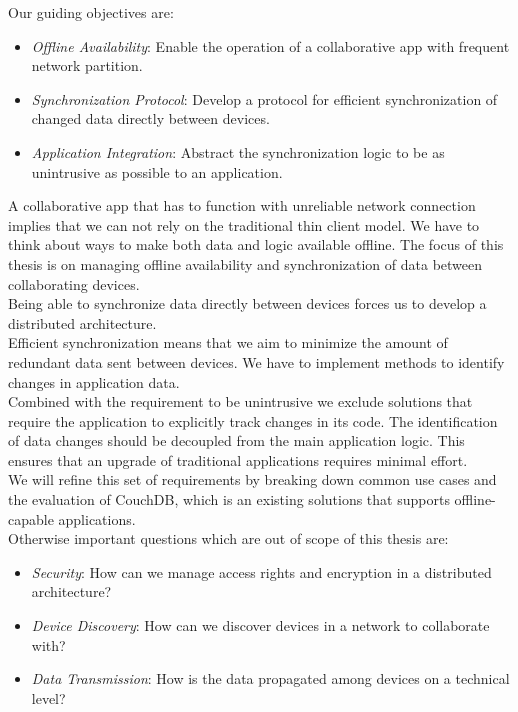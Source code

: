 Our guiding objectives are:

\begin{itemize}
\item \emph{Offline Availability}: Enable the operation of a collaborative app with frequent network partition.
\item \emph{Synchronization Protocol}: Develop a protocol for efficient synchronization of changed data directly between devices.
\item \emph{Application Integration}: Abstract the synchronization logic to be as unintrusive as possible to an application.
\end{itemize}

A collaborative app that has to function with unreliable network connection implies that we can not rely on the traditional thin client model.
We have to think about ways to make both data and logic available offline.
The focus of this thesis is on managing offline availability and synchronization of data between collaborating devices.\\
Being able to synchronize data directly between devices forces us to develop a distributed architecture.\\
Efficient synchronization means that we aim to minimize the amount of redundant data sent between devices.
We have to implement methods to identify changes in application data.\\
Combined with the requirement to be unintrusive we exclude solutions that require the application to explicitly track changes in its code.
The identification of data changes should be decoupled from the main application logic.
This ensures that an upgrade of traditional applications requires minimal effort.\\

We will refine this set of requirements by breaking down common use cases and the evaluation of CouchDB, which is an existing solutions that supports offline-capable applications.\\

Otherwise important questions which are out of scope of this thesis are:

\begin{itemize}
\item \emph{Security}: How can we manage access rights and encryption in a distributed architecture?
\item \emph{Device Discovery}: How can we discover devices in a network to collaborate with?
\item \emph{Data Transmission}: How is the data propagated among devices on a technical level?
\end{itemize}

